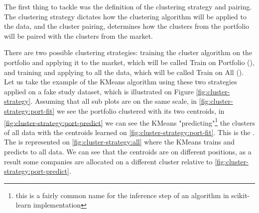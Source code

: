 The first thing to tackle was the definition of the clustering strategy and pairing. The clustering strategy dictates how the clustering algorithm will be applied to the data, and the cluster pairing, determines how the clusters from the portfolio will be paired with the clusters from the market.

There are two possible clustering strategies: training the cluster algorithm on the portfolio and applying it to the market, which will be called Train on Portfolio (\nameClusterStrategyA{}), and training and applying to all the data, which will be called Train on All (\nameClusterStrategyB{}). Let us take the example of the KMeans algorithm using these two strategies applied on a fake study dataset, which is illustrated on Figure \ref{fig:cluster-strategy}. Assuming that all sub plots are on the same scale, in \ref{fig:cluster-strategy:port-fit} we see the portfolio clustered with its two centroids, in \ref{fig:cluster-strategy:port-predict} we can see the KMeans "predicting"\footnote{this is a fairly common name for the inference step of an algorithm in scikit-learn implementation} the clusters of all data with the centroids learned on \ref{fig:cluster-strategy:port-fit}. This is the \nameClusterStrategyA{}. The \nameClusterStrategyB{} is represented on \ref{fig:cluster-strategy:all} where the KMeans trains and predicts to all data. We can see that the centroids are on different positions, as a result some companies are allocated on a different cluster relative to \ref{fig:cluster-strategy:port-predict}. 


